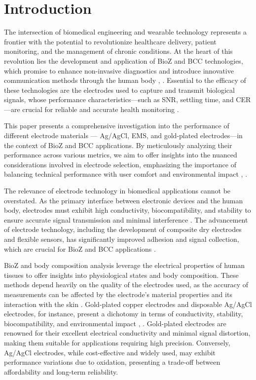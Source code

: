 \section{Introduction}
{
    The intersection of biomedical engineering and wearable technology represents a frontier with the potential to revolutionize healthcare delivery, patient monitoring, and the management of chronic conditions. At the heart of this revolution lies the development and application of \gls{BioZ}   and \gls{BCC}  technologies, which promise to enhance non-invasive diagnostics and introduce innovative communication methods through the human body \cite{Grimnes2000bioimpedance}, \cite{Tallgren2005Evaluation}. Essential to the efficacy of these technologies are the electrodes used to capture and transmit biological signals, whose performance characteristics—such as \gls{SNR}, settling time, and \gls{CER} —are crucial for reliable and accurate health monitoring \cite{ormanis2020towards}.

    This paper presents a comprehensive investigation into the performance of different electrode materials — Ag/AgCl, \gls{EMS}, and gold-plated electrodes—in the context of \gls{BioZ}  and \gls{BCC} applications. By meticulously analyzing their performance across various metrics, we aim to offer insights into the nuanced considerations involved in electrode selection, emphasizing the importance of balancing technical performance with user comfort and environmental impact \cite{Zen2004Amino}, \cite{NunezBajo2017Integration}.
    
    The relevance of electrode technology in biomedical applications cannot be overstated. As the primary interface between electronic devices and the human body, electrodes must exhibit high conductivity, biocompatibility, and stability to ensure accurate signal transmission and minimal interference \cite{lee2021recent}. The advancement of electrode technology, including the development of composite dry electrodes and flexible sensors, has significantly improved adhesion and signal collection, which are crucial for \gls{BioZ}  and \gls{BCC} applications \cite{rabbani2023low}.
    
    \gls{BioZ}  and body composition analysis leverage the electrical properties of human tissues to offer insights into physiological states and body composition. These methods depend heavily on the quality of the electrodes used, as the accuracy of measurements can be affected by the electrode's material properties and its interaction with the skin \cite{s23094251}. Gold-plated copper electrodes and disposable Ag/AgCl electrodes, for instance, present a dichotomy in terms of conductivity, stability, biocompatibility, and environmental impact \cite{Zhao2018Fabrication}, \cite{Almeida2014On-site}. Gold-plated electrodes are renowned for their excellent electrical conductivity and minimal signal distortion, making them suitable for applications requiring high precision. Conversely, Ag/AgCl electrodes, while cost-effective and widely used, may exhibit performance variations due to oxidation, presenting a trade-off between affordability and long-term reliability.
    
}
